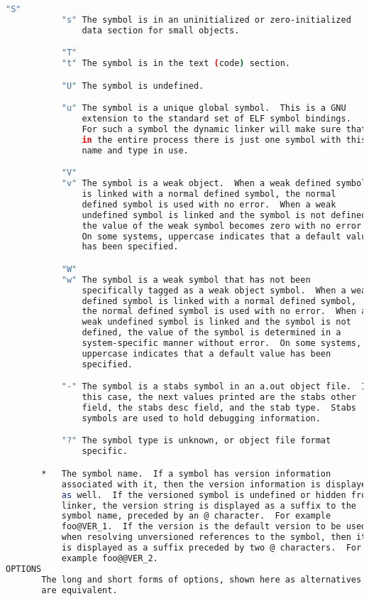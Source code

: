 {{\begin{lstlisting}[language=bash]
           "S"
           "s" The symbol is in an uninitialized or zero-initialized
               data section for small objects.

           "T"
           "t" The symbol is in the text (code) section.

           "U" The symbol is undefined.

           "u" The symbol is a unique global symbol.  This is a GNU
               extension to the standard set of ELF symbol bindings.
               For such a symbol the dynamic linker will make sure that
               in the entire process there is just one symbol with this
               name and type in use.

           "V"
           "v" The symbol is a weak object.  When a weak defined symbol
               is linked with a normal defined symbol, the normal
               defined symbol is used with no error.  When a weak
               undefined symbol is linked and the symbol is not defined,
               the value of the weak symbol becomes zero with no error.
               On some systems, uppercase indicates that a default value
               has been specified.

           "W"
           "w" The symbol is a weak symbol that has not been
               specifically tagged as a weak object symbol.  When a weak
               defined symbol is linked with a normal defined symbol,
               the normal defined symbol is used with no error.  When a
               weak undefined symbol is linked and the symbol is not
               defined, the value of the symbol is determined in a
               system-specific manner without error.  On some systems,
               uppercase indicates that a default value has been
               specified.

           "-" The symbol is a stabs symbol in an a.out object file.  In
               this case, the next values printed are the stabs other
               field, the stabs desc field, and the stab type.  Stabs
               symbols are used to hold debugging information.

           "?" The symbol type is unknown, or object file format
               specific.

       *   The symbol name.  If a symbol has version information
           associated with it, then the version information is displayed
           as well.  If the versioned symbol is undefined or hidden from
           linker, the version string is displayed as a suffix to the
           symbol name, preceded by an @ character.  For example
           foo@VER_1.  If the version is the default version to be used
           when resolving unversioned references to the symbol, then it
           is displayed as a suffix preceded by two @ characters.  For
           example foo@@VER_2.
OPTIONS
       The long and short forms of options, shown here as alternatives,
       are equivalent.


\end{lstlisting}}}
